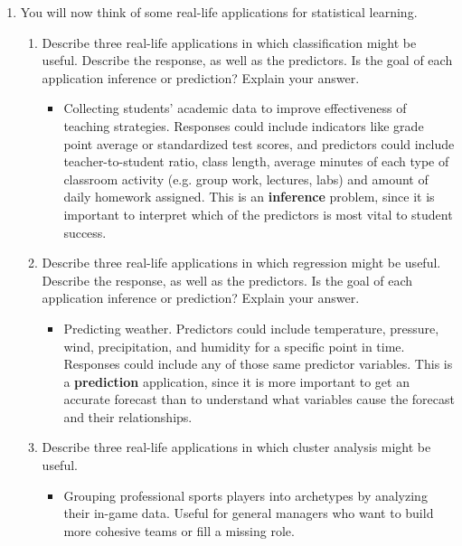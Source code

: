 \documentclass[11pt]{article}
\begin{document}
\begin{enumerate}
  \item You will now think of some real-life applications for
    statistical learning.
    \begin{enumerate}
      \item Describe three real-life applications in which classification might
        be useful. Describe the response, as well as the predictors. Is the
        goal of each application inference or prediction? Explain your
        answer.
        \begin{itemize}
          \item Collecting students' academic data to
            improve effectiveness of teaching strategies. Responses
            could include indicators like grade point average or
            standardized test scores, and predictors could include
            teacher-to-student ratio, class length, average minutes
            of each type of classroom activity (e.g. group work,
            lectures, labs) and amount of daily homework assigned.
            This is an \textbf{inference} problem, since it is
            important to interpret which of the predictors is most
            vital to student success.
        \end{itemize}

      \item Describe three real-life applications in which regression might
        be useful. Describe the response, as well as the predictors. Is the
        goal of each application inference or prediction? Explain your
        answer.
        \begin{itemize}
          \item Predicting weather. Predictors could include
            temperature, pressure, wind, precipitation, and humidity
            for a specific point in time. Responses could include any
            of those same predictor variables. This is a
            \textbf{prediction} application, since it is more
            important to get an accurate forecast than to understand
            what variables cause the forecast and their relationships.
        \end{itemize}
      \item Describe three real-life applications in which cluster analysis
        might be useful.
        \begin{itemize}
          \item Grouping professional sports players into archetypes
            by analyzing their in-game data. Useful for general
            managers who want to build more cohesive teams or fill a
            missing role.
        \end{itemize}
    \end{enumerate}


\end{enumerate}
\end{document}
